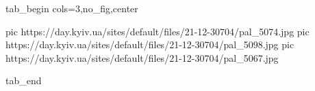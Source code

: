  
 
 
 
 


\ifcmt
  tab_begin cols=3,no_fig,center

     pic https://day.kyiv.ua/sites/default/files/21-12-30704/pal_5074.jpg
		 pic https://day.kyiv.ua/sites/default/files/21-12-30704/pal_5098.jpg
		 pic https://day.kyiv.ua/sites/default/files/21-12-30704/pal_5067.jpg

  tab_end
\fi
